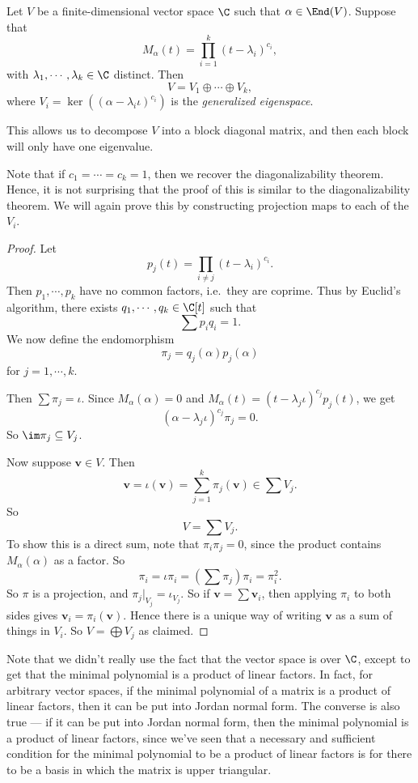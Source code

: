 \documentclass[a4paper]{article}
\begin{document}
\begin{thm}
  Let $V$ be a finite-dimensional vector space $\C$ such that $\alpha \in \End(V)$. Suppose that
  \[
    M_\alpha(t) = \prod_{i = 1}^k (t - \lambda_i)^{c_i},
  \]
  with $\lambda_1, \cdots, \lambda_k \in \C$ distinct. Then
  \[
    V = V_1 \oplus \cdots \oplus V_k,
  \]
  where $V_i = \ker((\alpha - \lambda_i \iota)^{c_i})$ is the \emph{generalized eigenspace}.
\end{thm}
This allows us to decompose $V$ into a block diagonal matrix, and then each block will only have one eigenvalue.

Note that if $c_1 = \cdots = c_k = 1$, then we recover the diagonalizability theorem. Hence, it is not surprising that the proof of this is similar to the diagonalizability theorem. We will again prove this by constructing projection maps to each of the $V_i$.

\begin{proof}
  Let
  \[
    p_j(t) = \prod_{i \not= j} (t - \lambda_i)^{c_i}.
  \]
  Then $p_1, \cdots, p_k$ have no common factors, i.e.\ they are coprime. Thus by Euclid's algorithm, there exists $q_1, \cdots, q_k \in \C[t]$ such that
  \[
    \sum p_i q_i = 1.
  \]
  We now define the endomorphism
  \[
    \pi_j = q_j(\alpha) p_j(\alpha)
  \]
  for $j = 1, \cdots, k$.

  Then $\sum \pi_j = \iota$. Since $M_\alpha(\alpha) = 0$ and $M_\alpha(t) = (t - \lambda_j \iota)^{c_j} p_j(t)$, we get
  \[
    (\alpha - \lambda_j \iota)^{c_j} \pi_j = 0.
  \]
  So $\im \pi_j \subseteq V_j$.

  Now suppose $\mathbf{v} \in V$. Then
  \[
    \mathbf{v} = \iota (\mathbf{v}) = \sum_{j = 1}^k \pi_j (\mathbf{v}) \in \sum V_j.
  \]
  So
  \[
    V = \sum V_j.
  \]
  To show this is a direct sum, note that $\pi_i \pi_j = 0$, since the product contains $M_\alpha(\alpha)$ as a factor. So
  \[
    \pi_i = \iota \pi_i = \left(\sum \pi_j\right) \pi_i = \pi_i^2.
  \]
  So $\pi$ is a projection, and $\pi_j|_{V_j} = \iota_{V_j}$. So if $\mathbf{v} = \sum \mathbf{v}_i$, then applying $\pi_i$ to both sides gives $\mathbf{v}_i = \pi_i (\mathbf{v})$. Hence there is a unique way of writing $\mathbf{v}$ as a sum of things in $V_i$. So $V = \bigoplus V_j$ as claimed.
\end{proof}
Note that we didn't really use the fact that the vector space is over $\C$, except to get that the minimal polynomial is a product of linear factors. In fact, for arbitrary vector spaces, if the minimal polynomial of a matrix is a product of linear factors, then it can be put into Jordan normal form. The converse is also true --- if it can be put into Jordan normal form, then the minimal polynomial is a product of linear factors, since we've seen that a necessary and sufficient condition for the minimal polynomial to be a product of linear factors is for there to be a basis in which the matrix is upper triangular.
\end{document}
